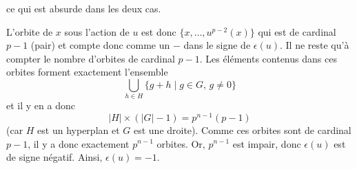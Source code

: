 \begin{demonstration}
\begin{itemize}
			ce qui est absurde dans les deux cas.
		\end{itemize}
		L'orbite de $x$ sous l'action de $u$ est donc $\{ x, \dots, u^{p-2}(x) \}$ qui est de cardinal $p-1$ (pair) et compte donc comme un $-$ dans le signe de $\epsilon(u)$.
		\newpar
		Il ne reste qu'à compter le nombre d'orbites de cardinal $p-1$. Les éléments contenus dans ces orbites forment exactement l'ensemble
		\[ \bigcup_{h \in H} \{ g + h \mid g \in G, \, g \neq 0 \} \]
		et il y en a donc
		\[ |H| \times (|G|-1) = p^{n-1}(p-1) \]
		(car $H$ est un hyperplan et $G$ est une droite). Comme ces orbites sont de cardinal $p-1$, il y a donc exactement $p^{n-1}$ orbites. Or, $p^{n-1}$ est impair, donc $\epsilon(u)$ est de signe négatif. Ainsi, $\epsilon(u) = -1$.
	\end{demonstration}

